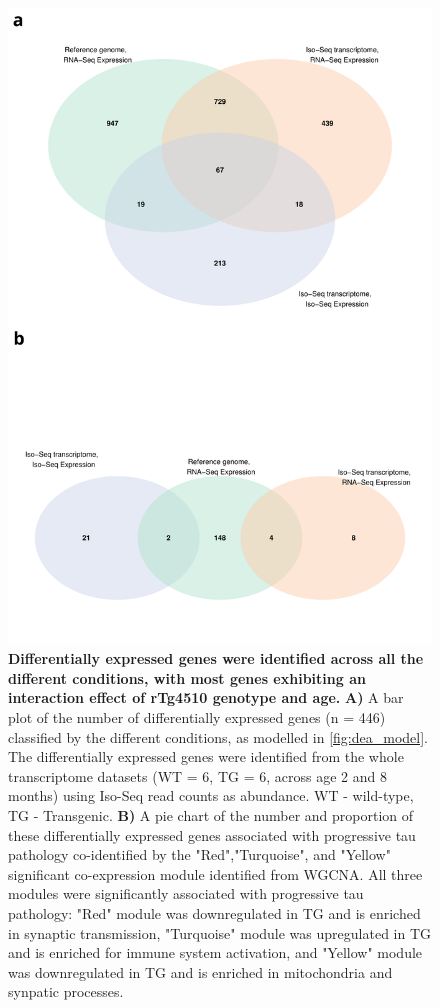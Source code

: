\begin{figure}[h]
	\centering
	\includegraphics[page=5,trim={0 20cm 0 0},clip,scale = 0.55]{Figures/WholeDifferentialAnalysis.pdf}
	\captionsetup{width=0.95\textwidth}
	\caption[Differentially expressed genes classified by conditions]%
	{\textbf{Differentially expressed genes were identified across all the different conditions, with most genes exhibiting an interaction effect of rTg4510 genotype and age.} \textbf{A)} A bar plot of the number of differentially expressed genes (n = 446) classified by the different conditions, as modelled in \cref{fig:dea_model}. The differentially expressed genes were identified from the whole transcriptome datasets (WT = 6, TG = 6, across age 2 and 8 months) using Iso-Seq read counts as abundance. WT - wild-type, TG - Transgenic. \textbf{B)} A pie chart of the number and proportion of these differentially expressed genes associated with progressive tau pathology co-identified by the "Red","Turquoise", and "Yellow" significant co-expression module identified from WGCNA. All three modules were significantly associated with progressive tau pathology: "Red" module was downregulated in TG and is enriched in synaptic transmission, "Turquoise" module was upregulated in TG and is enriched for immune system activation, and "Yellow" module was downregulated in TG and is enriched in mitochondria and synpatic processes.}    
	\label{fig:dea_model_num}
\end{figure}

